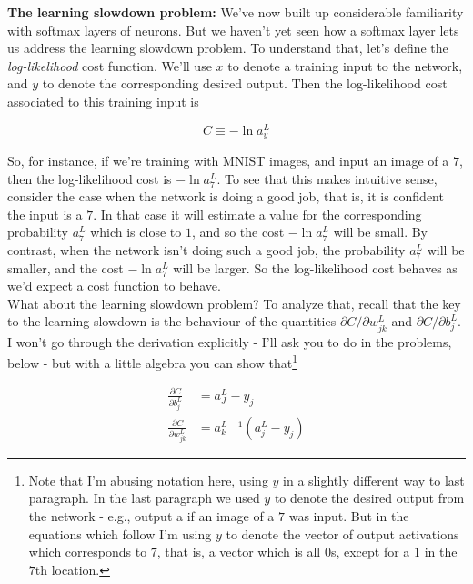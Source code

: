 \documentclass[a4paper,11pt,twoside]{report}
\begin{document}
\textbf{The learning slowdown problem:} We've now built up considerable familiarity with softmax layers of neurons. But we haven't yet seen how a softmax layer lets us address the learning slowdown problem. To understand that, let's define the \textit{log-likelihood} cost function. We'll use $x$ to denote a training input to the network, and $y$ to denote the corresponding desired output. Then the log-likelihood cost associated to this training input is

\begin{equation}
C\equiv -\ln a^L_y
\label{eq: log-likelihood cost function}
\end{equation}

So, for instance, if we're training with MNIST images, and input an image of a $7$, then the log-likelihood cost is $-\ln a^L_7$. To see that this makes intuitive sense, consider the case when the network is doing a good job, that is, it is confident the input is a $7$. In that case it will estimate a value for the corresponding probability $a^L_7$ which is close to $1$, and so the cost $-\ln a^L_7$ will be small. By contrast, when the network isn't doing such a good job, the probability $a^L_7$ will be smaller, and the cost $-\ln a^L_7$ will be larger. So the log-likelihood cost behaves as we'd expect a cost function to behave.\\

What about the learning slowdown problem? To analyze that, recall that the key to the learning slowdown is the behaviour of the quantities $\partial C/\partial w^L_{jk}$ and $\partial C/\partial b^L_j$. I won't go through the derivation explicitly - I'll ask you to do in the problems, below - but with a little algebra you can show that\footnote{Note that I'm abusing notation here, using $y$ in a slightly different way to last paragraph. In the last paragraph we used $y$ to denote the desired output from the network - e.g., output a  if an image of a $7$ was input. But in the equations which follow I'm using $y$ to denote the vector of output activations which corresponds to $7$, that is, a vector which is all $0$s, except for a $1$ in the $7$th location.}

\begin{equation}
\begin{aligned}
\frac{\partial C}{\partial b^L_j}&=a^L_J-y_j\\
\frac{\partial C}{\partial w^L_{jk}}&=a^{L-1}_k\left(a^L_j-y_j\right)
\end{aligned}
\label{eq: derivative of log-likelihood with respect to w and b}
\end{equation}
\end{document}
